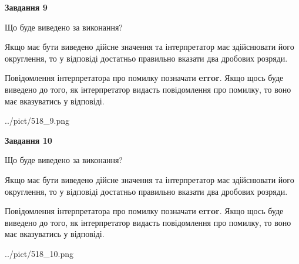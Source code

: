 \documentclass[12pt, ukrainian]{article}
\begin{document}
{\begin {Large}
{\begin {center}\textbf{Завдання 9}\end {center}}\par
Що буде виведено за виконання? \par

Якщо має бути виведено дійсне значення та інтерпретатор має здійснювати його округлення, 
то у відповіді достатньо правильно вказати два дробових розряди.

Повідомлення інтерпретатора про помилку позначати \textbf{error}.
Якщо щось буде виведено до того, як інтерпретатор видасть повідомлення про помилку, 
то воно має вказуватись у відповіді. \par

\begin{center}
	{../pict/518_9.png}
\end{center}
\newpage

{\begin {center}\textbf{Завдання 10}\end {center}}\par
Що буде виведено за виконання? \par

Якщо має бути виведено дійсне значення та інтерпретатор має здійснювати його округлення, 
то у відповіді достатньо правильно вказати два дробових розряди.

Повідомлення інтерпретатора про помилку позначати \textbf{error}.
Якщо щось буде виведено до того, як інтерпретатор видасть повідомлення про помилку, 
то воно має вказуватись у відповіді. \par

\begin{center}
	{../pict/518_10.png}
\end{center}
\newpage

\end {Large}}
\end{document}
